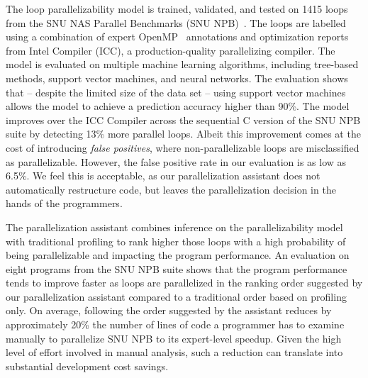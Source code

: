The loop parallelizability model is trained, validated, and tested on 1415 loops
from the SNU NAS Parallel Benchmarks (SNU
NPB)~\cite{Seo:2011:PCN:2357490.2358063}.
%
The loops are labelled using a combination of expert OpenMP~\cite{Dagum:1998:OIA:615255.615542}
annotations and optimization reports from Intel \cpp{} Compiler (ICC), a
production-quality parallelizing compiler.
%
The model is evaluated on multiple machine learning algorithms, including tree-based methods, support vector machines, and neural networks.
%
The evaluation shows that -- despite the limited size of the data set -- using
support vector machines allows the model to achieve a prediction accuracy higher than 90\%.
%
%
The model improves over the ICC Compiler across the sequential C version of the SNU NPB suite by detecting 13\% more parallel loops. Albeit this improvement comes at the cost of introducing \textit{false positives}, where non-parallelizable loops are misclassified as parallelizable. However, the false positive rate in our evaluation is as low as 6.5\%. We feel this is acceptable, as our parallelization assistant does not automatically restructure code, but leaves the parallelization decision in the hands of the programmers.

The parallelization assistant combines inference on the parallelizability model
with traditional profiling to rank higher those loops with a high probability of being parallelizable and impacting the program performance.
%
An evaluation on eight programs from the SNU NPB suite shows that
the program performance tends to improve faster as loops are parallelized in the ranking order suggested by our parallelization assistant compared to a traditional order based on profiling only.
%
On average, following the order suggested by the assistant reduces by approximately 20\% the number of lines of code a programmer has to examine manually to parallelize SNU NPB to its expert-level speedup.
%
Given the high level of effort involved in manual analysis, such a reduction
can translate into substantial development cost savings.

